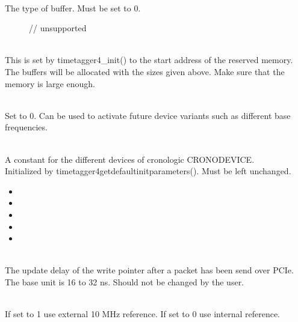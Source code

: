 			\\
			The type of buffer. Must be set to 0.
			\begin{description}
				\item[] 
				\item[]   // unsupported
			\end{description}

			\\
			This is set by timetagger4\_init() to the start address of the reserved memory.\\ 
			The buffers will be allocated with the sizes given above. Make sure that the memory is large enough.\par

			\\
			Set to 0. Can be used to activate future device variants such as different base frequencies.\par

			\\
			A constant for the different devices of cronologic \textsf{CRONO\tu DEVICE\tu *}.\\
			Initialized by \textsf{timetagger4\tu get\tu default\tu init\tu parameters()}. Must be left unchanged.
			\begin{itemize}
				\item[] 
				\item[] 
				\item[] 
				\item[] 
				\item[] 
			\end{itemize}

			\\
			The update delay of the write pointer after a packet has been send over PCIe. The base unit is 16 to 32 ns.
			Should not be changed by the user.\par

			\\
			If set to 1 use external 10 MHz reference. If set to 0 use internal reference.\par

